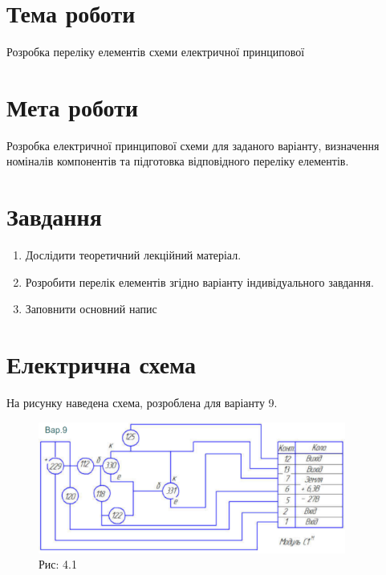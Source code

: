 \documentclass[a4paper]{article}
\begin{document}
\section*{Тема роботи}
Розробка
переліку елементів схеми електричної принципової

\section*{Мета роботи}
Розробка електричної принципової схеми для заданого варіанту, визначення номіналів компонентів та підготовка відповідного переліку елементів.

\section*{Завдання}

\begin{enumerate}
    \item Дослідити теоретичний лекційний матеріал.
    \item Розробити перелік елементів згідно варіанту індивідуального завдання.
    \item Заповнити основний напис
\end{enumerate}

\section*{Електрична схема}
На рисунку наведена схема, розроблена для варіанту 9.

\begin{figure}[h]
    \centering
    \includegraphics[width=0.9\textwidth]{imgs/PW4.1.png}
    \caption*{Рис: 4.1}
\end{figure}
\end{document}
